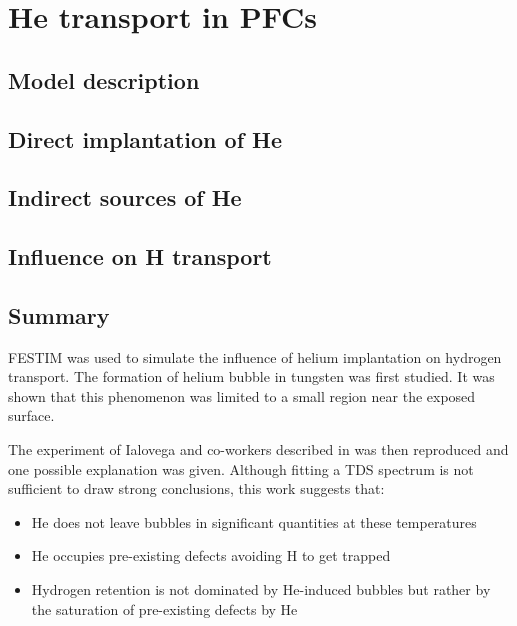 \setchapterpreamble[u]{\margintoc}
\chapter{He transport in PFCs}
\label{Chapter5} %


\section{Model description}\label{helium model description}

\section{Direct implantation of He}

\section{Indirect sources of He}

\section{Influence on H transport}


\section{Summary}

FESTIM was used to simulate the influence of helium implantation on hydrogen transport.
The formation of helium bubble in tungsten was first studied.
It was shown that this phenomenon was limited to a small region near the exposed surface.

The experiment of Ialovega and co-workers described in  was then reproduced and one possible explanation was given.
Although fitting a TDS spectrum is not sufficient to draw strong conclusions, this work suggests that:
\begin{itemize}
    \item He does not leave bubbles in significant quantities at these temperatures
    \item He occupies pre-existing defects avoiding H to get trapped
    \item Hydrogen retention is not dominated by He-induced bubbles but rather by the saturation of pre-existing defects by He
\end{itemize}

